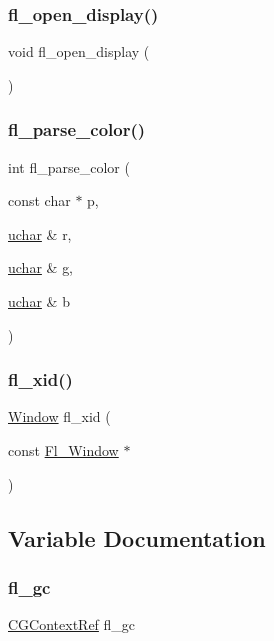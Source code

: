 \subsubsection{\texorpdfstring{fl\+\_\+open\+\_\+display()}{fl\_open\_display()}}
{\footnotesize\ttfamily void fl\+\_\+open\+\_\+display (\begin{DoxyParamCaption}{ }\end{DoxyParamCaption})}

\mbox{\label{mac_8_h_aa5133e4cd5219d5f79ea60727c205a22}} 
\subsubsection{\texorpdfstring{fl\+\_\+parse\+\_\+color()}{fl\_parse\_color()}}
{\footnotesize\ttfamily int fl\+\_\+parse\+\_\+color (\begin{DoxyParamCaption}\item[{const char $\ast$}]{p,  }\item[{\hyperlink{fl__types_8h_a65f85814a8290f9797005d3b28e7e5fc}{uchar} \&}]{r,  }\item[{\hyperlink{fl__types_8h_a65f85814a8290f9797005d3b28e7e5fc}{uchar} \&}]{g,  }\item[{\hyperlink{fl__types_8h_a65f85814a8290f9797005d3b28e7e5fc}{uchar} \&}]{b }\end{DoxyParamCaption})}

\mbox{\label{mac_8_h_a87152d2ed84f9d97c6bf3150c7688261}} 
\subsubsection{\texorpdfstring{fl\+\_\+xid()}{fl\_xid()}}
{\footnotesize\ttfamily \hyperlink{mac_8_h_a213656d363e884b651cc92f58e863fc6}{Window} fl\+\_\+xid (\begin{DoxyParamCaption}\item[{const \hyperlink{class_fl___window}{Fl\+\_\+\+Window} $\ast$}]{ }\end{DoxyParamCaption})}



\subsection{Variable Documentation}
\mbox{\label{mac_8_h_a34fa7427998af327143f335a71a66733}} 
\subsubsection{\texorpdfstring{fl\+\_\+gc}{fl\_gc}}
{\footnotesize\ttfamily \hyperlink{mac_8_h_aa24159a5753580ec784c2fd390213c7f}{C\+G\+Context\+Ref} fl\+\_\+gc}

